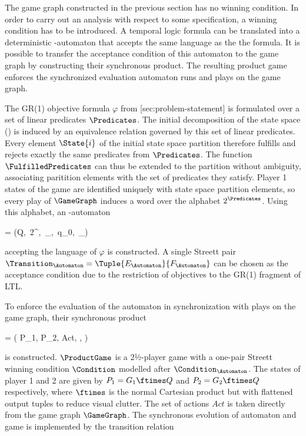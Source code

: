 The game graph constructed in the previous section has no winning condition.
In order to carry out an analysis with respect to some specification, a winning condition has to be introduced.
A temporal logic formula can be translated into a deterministic \omega-automaton that accepts the same language as the the formula.
It is possible to transfer the acceptance condition of this automaton to the game graph by constructing their synchronous product.
The resulting product game enforces the synchronized evaluation automaton runs and plays on the game graph.


\startsubsection[title={Objective Automaton},reference=sec:abstraction-product-automaton]

    The GR(1) objective formula $\varphi$ from [sec:problem-statement] is formulated over a set of linear predicates $\Predicates$.
    The initial decomposition of the state space () is induced by an equivalence relation governed by this set of linear predicates.
    Every element $\State{i}$ of the initial state space partition therefore fulfills and rejects exactly the same predicates from $\Predicates$.
    The function $\FulfilledPredicates$ can thus be extended to the partition without ambiguity, associating paritition elements with the set of predicates they satisfy.
    Player 1 states of the game are identified uniquely with state space partition elements, so every play of $\GameGraph$ induces a word over the alphabet $2^\Predicates$.
    Using this alphabet, an \omega-automaton

    \startformula
        \Automaton = (Q,\, 2^\Predicates,\, \Transition_\Automaton,\, q_0,\, \Condition_\Automaton)
    \stopformula

    accepting the language of $\varphi$ is constructed.
    A single Streett pair $\Transition_\Automaton = \Tuple{E_\Automaton}{F_\Automaton}$ can be chosen as the acceptance condition due to the restriction of objectives to the GR(1) fragment of LTL.

\stopsubsection


\startsubsection[title={Synchronized Product},reference=sec:abstraction-product-product]

    To enforce the evaluation of the automaton in synchronization with plays on the game graph, their synchronous product

    \startformula
        \ProductGame = ( P_1, P_2, Act, \Transition, \Condition )
    \stopformula

    is constructed.
    $\ProductGame$ is a 2½-player game with a one-pair Streett winning condition $\Condition$ modelled after $\Condition_\Automaton$.
    The states of player 1 and 2 are given by $P_1 = G_1 \ftimes Q$ and $P_2 = G_2 \ftimes Q$ respectively, where $\ftimes$ is the normal Cartesian product but with flattened output tuples to reduce visual clutter.
    The set of actions $Act$ is taken directly from the game graph $\GameGraph$.
    The synchronous evolution of automaton and game is implemented by the transition relation

